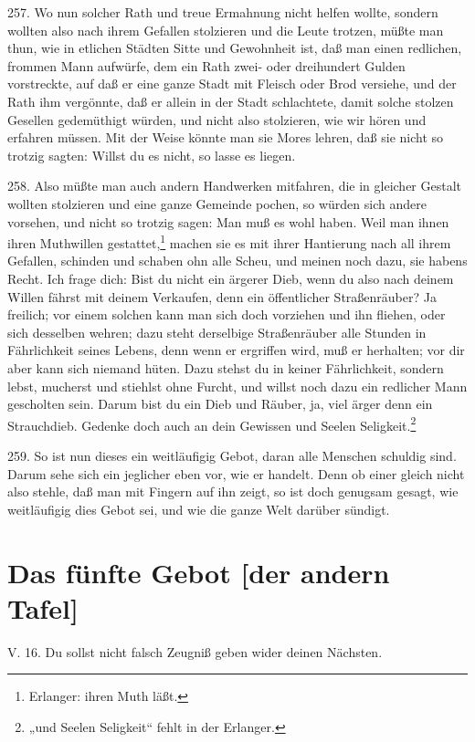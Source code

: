 257. Wo nun solcher Rath und treue Ermahnung nicht helfen wollte, sondern wollten also nach ihrem Gefallen stolzieren und die Leute trotzen, müßte man thun, wie in etlichen Städten Sitte und Gewohnheit ist, daß man einen redlichen, frommen Mann aufwürfe, dem ein Rath zwei- oder dreihundert Gulden vorstreckte, auf daß er eine ganze Stadt mit Fleisch oder Brod versiehe, und der Rath ihm vergönnte, daß er allein in der Stadt schlachtete, damit solche stolzen Gesellen gedemüthigt würden, und nicht also stolzieren, wie wir hören und erfahren müssen. Mit der Weise könnte man sie Mores lehren, daß sie nicht so trotzig sagten: Willst du es nicht, so lasse es liegen.

258. Also müßte man auch andern Handwerken mitfahren, die in gleicher Gestalt wollten stolzieren und eine ganze Gemeinde pochen, so würden sich andere vorsehen, und nicht so trotzig sagen: Man muß es wohl haben. Weil man ihnen ihren Muthwillen gestattet,\footnote{Erlanger: ihren Muth läßt.} machen sie es mit ihrer Hantierung nach all ihrem Gefallen, schinden und schaben ohn alle Scheu, und meinen noch dazu, sie habens Recht. Ich frage dich: Bist du nicht ein ärgerer Dieb, wenn du also nach deinem Willen fährst mit deinem Verkaufen, denn ein öffentlicher Straßenräuber? Ja freilich; vor einem solchen kann man sich doch vorziehen und ihn fliehen, oder sich desselben wehren; dazu steht derselbige Straßenräuber alle Stunden in Fährlichkeit seines Lebens, denn wenn er ergriffen wird, muß er herhalten; vor dir aber kann sich niemand hüten. Dazu stehst du in keiner Fährlichkeit, sondern lebst, mucherst und stiehlst ohne Furcht, und willst noch dazu ein redlicher Mann gescholten sein. Darum bist du ein Dieb und Räuber, ja, viel ärger denn ein Strauchdieb. Gedenke doch auch an dein Gewissen und Seelen Seligkeit.\footnote{„und Seelen Seligkeit“ fehlt in der Erlanger.}

259. So ist nun dieses ein weitläufigig Gebot, daran alle Menschen schuldig sind. Darum sehe sich ein jeglicher eben vor, wie er handelt. Denn ob einer gleich nicht also stehle, daß man mit Fingern auf ihn zeigt, so ist doch genugsam gesagt, wie weitläufigig dies Gebot sei, und wie die ganze Welt darüber sündigt.

\section{Das fünfte Gebot [der andern Tafel]}

\begin{schriftzitat}
V. 16. Du sollst nicht falsch Zeugniß geben wider deinen Nächsten.
\end{schriftzitat}

